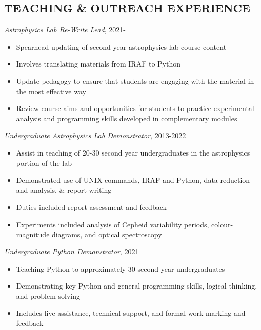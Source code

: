 \documentclass[letter, margin, 10pt]{res} %
\begin{document}
\begin{resume}
\section{TEACHING \& OUTREACH EXPERIENCE}

{\sl Astrophysics Lab Re-Write Lead}, 2021-
\begin{itemize}[noitemsep,topsep=0pt,parsep=0pt,partopsep=0pt]
\item Spearhead updating of second year astrophysics lab course content
\item Involves translating materials from IRAF to Python
\item Update pedagogy to ensure that students are engaging with the material in the most effective way
\item Review course aims and opportunities for students to practice experimental analysis and programming skills developed in complementary modules
\end{itemize}

\vspace{-10pt}

{\sl Undergraduate Astrophysics Lab Demonstrator}, 2013-2022
\begin{itemize}[noitemsep,topsep=0pt,parsep=0pt,partopsep=0pt]
\item Assist in teaching of 20-30 second year undergraduates in the astrophysics portion of the lab
\item Demonstrated use of UNIX commands, IRAF and Python, data reduction and analysis, \& report writing
\item Duties included report assessment and feedback
\item Experiments included analysis of Cepheid variability periods, colour-magnitude diagrams, and optical spectroscopy
\end{itemize}

\vspace{-10pt}

{\sl Undergraduate Python Demonstrator}, 2021
\begin{itemize}[noitemsep,topsep=0pt,parsep=0pt,partopsep=0pt]
\item Teaching Python to approximately 30 second year undergraduates
\item Demonstrating key Python and general programming skills, logical thinking, and problem solving
\item Includes live assistance, technical support, and formal work marking and feedback
\end{itemize}


\end{resume}
\end{document}
